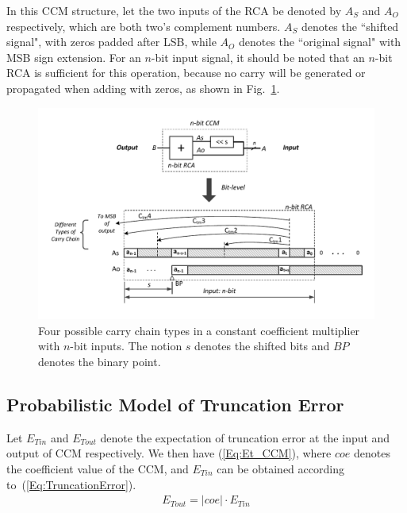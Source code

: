 \documentclass[prodmode,acmtrets]{acmsmall} %
\begin{document}
In this CCM structure, let the two inputs of the RCA be denoted by $A_S$ and $A_O$ respectively, which are both two's complement numbers. $A_S$ denotes the ``shifted signal", with zeros padded after LSB, while $A_O$ denotes the ``original signal" with MSB sign extension. For an $n$-bit input signal, it should be noted that an $n$-bit RCA is sufficient for this operation, because no carry will be generated or propagated when adding with zeros, as shown in Fig.~\ref{CCM_fig}.
%
\begin{figure}[htbp]
  \vspace{-4ex}
  \centering
  \includegraphics[width=\textwidth]{./Figures/CCM_CarryChain.pdf}
  \vspace{-6ex}
  \caption{Four possible carry chain types in a constant coefficient multiplier with $n$-bit inputs. The notion $s$ denotes the shifted bits and $BP$ denotes the binary point.}
  \label{CCM_fig}
\end{figure}

\subsection{Probabilistic Model of Truncation Error}
Let $E_{Tin}$ and $E_{Tout}$ denote the expectation of truncation error at the input and output of CCM respectively. We then have (\ref{Eq:Et_CCM}), where $coe$ denotes the coefficient value of the CCM, and $E_{Tin}$ can be obtained according to~(\ref{Eq:TruncationError}).
%
\begin{eqnarray}\label{Eq:Et_CCM}
  E_{Tout}=|coe|\cdot E_{Tin}
\end{eqnarray}
\end{document}
